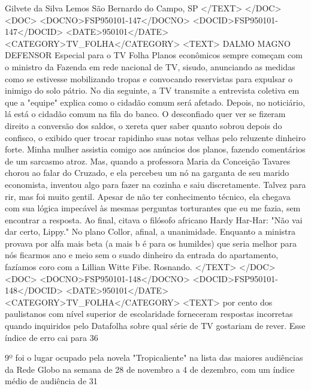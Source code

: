 Gilvete da Silva Lemos São Bernardo do Campo, SP
</TEXT>
</DOC>
<DOC>
<DOCNO>FSP950101-147</DOCNO>
<DOCID>FSP950101-147</DOCID>
<DATE>950101</DATE>
<CATEGORY>TV_FOLHA</CATEGORY>
<TEXT>
DALMO MAGNO DEFENSOR 
Especial para o TV Folha 
Planos econômicos sempre começam com o ministro da Fazenda em rede nacional de TV, sisudo, anunciando as medidas como se estivesse mobilizando tropas e convocando reservistas para expulsar o inimigo do solo pátrio.
No dia seguinte, a TV transmite a entrevista coletiva em que a "equipe" explica como o cidadão comum será afetado.
Depois, no noticiário, lá está o cidadão comum na fila do banco. O desconfiado quer ver se fizeram direito a conversão dos saldos, o xereta quer saber quanto sobrou depois do confisco, o exibido quer trocar rapidinho suas notas velhas pelo reluzente dinheiro forte.
Minha mulher assistia comigo aos anúncios dos planos, fazendo comentários de um sarcasmo atroz. Mas, quando a professora Maria da Conceição Tavares chorou ao falar do Cruzado, e ela percebeu um nó na garganta de seu marido economista, inventou algo para fazer na cozinha e saiu discretamente. Talvez para rir, mas foi muito gentil.
Apesar de não ter conhecimento técnico, ela chegava com sua lógica impecável às mesmas perguntas torturantes que eu me fazia, sem encontrar a resposta. Ao final, citava o filósofo africano Hardy Har-Har: "Não vai dar certo, Lippy."
No plano Collor, afinal, a unanimidade. Enquanto a ministra provava por alfa mais beta (a mais b é para os humildes) que seria melhor para nós ficarmos ano e meio sem o suado dinheiro da entrada do apartamento, fazíamos coro com a Lillian Witte Fibe. Rosnando.
</TEXT>
</DOC>
<DOC>
<DOCNO>FSP950101-148</DOCNO>
<DOCID>FSP950101-148</DOCID>
<DATE>950101</DATE>
<CATEGORY>TV_FOLHA</CATEGORY>
<TEXT>
por cento dos paulistanos com nível superior de escolaridade forneceram respostas incorretas quando inquiridos pelo Datafolha sobre qual série de TV gostariam de rever. Esse índice de erro cai para 36%

9º 
foi o lugar ocupado pela novela "Tropicaliente" na lista das maiores audiências da Rede Globo na semana de 28 de novembro a 4 de dezembro, com um índice médio de audiência de 31%

